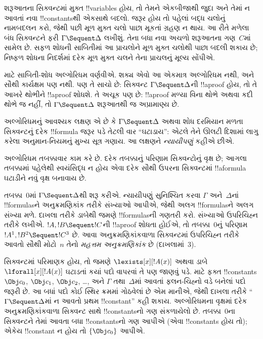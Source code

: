 \documentclass[../../../include/open-logic-section]{subfiles}
\begin{document}


શરૂઆતના સિક્વન્ટમાં મુક્ત !!{variable}s હોય, તો
તેમને એકબીજાથી જુદા અને તેમાં ન આવતાં નવા
!!{constant}sથી એકસાથે બદલો. જરૂર હોય તો પહેલાં
બદ્ધ ચલોનું નામબદલન કરો, જેથી પછી મૂળ મુક્ત ચલો
પાછા મૂકતાં ગ્રહણ ન થાય. આ રીતે મળેલા બંધ
સિક્વન્ટને ફરી $\Gamma\Sequent\Delta$ લખીશું.
તેના બધા નવા અચળો શરૂઆતના ગણ~$C$માં સામેલ છે.
સફળ શોધની સાબિતીમાં આ પ્રાચલોને મૂળ મુક્ત ચલોથી
પાછા બદલી શકાય છે; નિષ્ફળ શોધના નિદર્શમાં દરેક
મૂળ મુક્ત ચલને તેના પ્રાચલનું મૂલ્ય સોંપીએ.

 માટે
સાબિતી-શોધ
અલ્ગોરિધમ વર્ણવીએ.
શક્ય એવો
આ એકમાત્ર
અલ્ગોરિધમ નથી,
અને સૌથી
કાર્યક્ષમ પણ
નથી. પણ તે
સાચો છે:
સિક્વન્ટ
$\Gamma \Sequent \Delta$ની
!!a{proof}
હોય, તો
તે આખરે
થોભીને
!!a{proof}
શોધશે. તે
અચૂક પણ
છે: !!a{proof}
મળ્યા વિના
થોભે અથવા
કદી થોભે
જ નહીં,
તો
$\Gamma
\Sequent \Delta$
શરૂઆતથી જ
અપ્રામાણ્ય
છે.

અલ્ગોરિધમનું
આવશ્યક લક્ષણ
એ છે કે
$\Gamma \Sequent \Delta$
અથવા શોધ
દરમિયાન મળતા
સિક્વન્ટનું
દરેક
!!{formula}
જરૂર પડે
તેટલી વાર
``ઘટાડાય'':
એટલે તેને
ઊલટી દિશામાં
લાગુ કરેલા
અનુમાન-નિયમનું
મુખ્ય સૂત્ર
ગણાય. આ
લક્ષણને
\emph{ન્યાયીપણું}
કહીએ છીએ.

અલ્ગોરિધમ
તબક્કાવાર
કામ કરે છે.
દરેક તબક્કાનું
પરિણામ
સિક્વન્ટોનું
વૃક્ષ છે;
આગલા તબક્કામાં
પહેલેથી સ્વયંસિદ્ધ
ન હોય એવા
દરેક સૌથી
ઉપરના સિક્વન્ટમાં
!!a{formula}
ઘટાડીને
નવું વૃક્ષ
બનાવાય છે.

તબક્કા~$0$માં
$\Gamma \Sequent \Delta$થી
શરૂ કરીએ.
ન્યાયીપણું
સુનિશ્ચિત કરવા
$\Gamma$
અને~$\Delta$નાં
!!{formula}sને
અનુક્રમણિકાંક
તરીકે સંખ્યાઓ
આપીએ, જેથી
અલગ
!!{formula}sને
અલગ સંખ્યા
મળે. દાખલા
તરીકે ડાબેથી
જમણે
!!{formula}sની
ગણતરી કરો.
સંખ્યાઓ
ઉપરિચિહ્ન
તરીકે
લખીએ.
$!A, !B \Sequent !C$ની
!!a{proof}
શોધતા હોઈએ,
તો તબક્કા~$0$નું
પરિણામ
$!A^1, !B^2 \Sequent !C^3$
છે. આવા
અનુક્રમણિકાંકવાળા
સિક્વન્ટમાં
ઉપરિચિહ્ન
તરીકે આવતો
સૌથી મોટો~$n$
તેનો
\emph{મહત્તમ
અનુક્રમણિકાંક}
છે (દાખલામાં~$3$).

સિક્વન્ટમાં
પરિમાણક
હોય, તો જમણે
$\lexists[x][!A(x)]$
અથવા ડાબે
$\lforall[x][!A(x)]$
ઘટાડતાં કયાં
પદો વાપરવાં
તે પણ જાણવું
પડે. માટે
ફક્ત
!!{constant}s
$\Obj c_0$,
$\Obj c_1$,
$\Obj c_2$,
\dots, અને
$\Gamma$
તથા~$\Delta$માં
આવતાં ફલન-ચિહ્નો
વડે બનેલાં
પદો જરૂરી
છે. આ
બધાં પદો
કોઈ સ્થિર
ક્રમમાં ગોઠવેલાં
છે એમ
માનીએ, જેથી
દાખલા તરીકે
``$\Gamma \Sequent \Delta$માં
ન આવતો
પ્રથમ
!!{constant}''
કહી શકાય.
અલ્ગોરિધમના
વૃક્ષમાં દરેક
અનુક્રમણિકાંકવાળા
સિક્વન્ટ સાથે
!!{constant}sનો
ગણ સંકળાયેલો
છે. તબક્કા~$0$ના
સિક્વન્ટને
તેમાં આવતા
બધા
!!{constant}sનો
ગણ આપીએ
(એવા !!{constant}s
હોય તો);
એકેય !!{constant}
ન
હોય તો
$\{\Obj c_0\}$
આપીએ.
\end{document}
